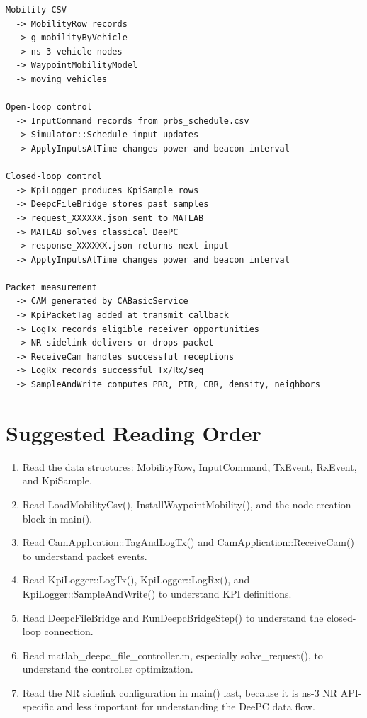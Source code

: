 \documentclass[11pt]{article}
\DeclareRobustCommand{\code}[1]{\texttt{\detokenize{#1}}}
\def\code#1{#1}%
\begin{document}
\begin{lstlisting}[style=textstyle]
Mobility CSV
  -> MobilityRow records
  -> g_mobilityByVehicle
  -> ns-3 vehicle nodes
  -> WaypointMobilityModel
  -> moving vehicles

Open-loop control
  -> InputCommand records from prbs_schedule.csv
  -> Simulator::Schedule input updates
  -> ApplyInputsAtTime changes power and beacon interval

Closed-loop control
  -> KpiLogger produces KpiSample rows
  -> DeepcFileBridge stores past samples
  -> request_XXXXXX.json sent to MATLAB
  -> MATLAB solves classical DeePC
  -> response_XXXXXX.json returns next input
  -> ApplyInputsAtTime changes power and beacon interval

Packet measurement
  -> CAM generated by CABasicService
  -> KpiPacketTag added at transmit callback
  -> LogTx records eligible receiver opportunities
  -> NR sidelink delivers or drops packet
  -> ReceiveCam handles successful receptions
  -> LogRx records successful Tx/Rx/seq
  -> SampleAndWrite computes PRR, PIR, CBR, density, neighbors
\end{lstlisting}

\section{Suggested Reading Order}

\begin{enumerate}
  \item Read the data structures: \code{MobilityRow}, \code{InputCommand},
  \code{TxEvent}, \code{RxEvent}, and \code{KpiSample}.
  \item Read \code{LoadMobilityCsv()}, \code{InstallWaypointMobility()}, and the
  node-creation block in \code{main()}.
  \item Read \code{CamApplication::TagAndLogTx()} and
  \code{CamApplication::ReceiveCam()} to understand packet events.
  \item Read \code{KpiLogger::LogTx()}, \code{KpiLogger::LogRx()}, and
  \code{KpiLogger::SampleAndWrite()} to understand KPI definitions.
  \item Read \code{DeepcFileBridge} and \code{RunDeepcBridgeStep()} to understand
  the closed-loop connection.
  \item Read \code{matlab_deepc_file_controller.m}, especially
  \code{solve_request()}, to understand the controller optimization.
  \item Read the NR sidelink configuration in \code{main()} last, because it is
  ns-3 NR API-specific and less important for understanding the DeePC data flow.
\end{enumerate}
\end{document}
